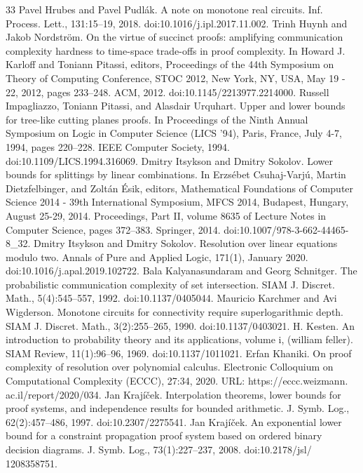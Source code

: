 \documentclass[10pt,a4paper]{article}
\begin{document}
\begin{thebibliography}{33}
 Pavel Hrubes and Pavel Pudlák. A note on monotone real circuits. Inf. Process. Lett., 131:15–19, 2018. doi:10.1016/j.ipl.2017.11.002.
 Trinh Huynh and Jakob Nordström. On the virtue of succinct proofs: amplifying communication complexity hardness to time-space trade-offs in proof complexity. In Howard J. Karloff and Toniann Pitassi, editors, Proceedings of the 44th Symposium on Theory of Computing Conference, STOC 2012, New York, NY, USA, May 19 - 22, 2012, pages 233–248. ACM, 2012. doi:10.1145/2213977.2214000.
 Russell Impagliazzo, Toniann Pitassi, and Alasdair Urquhart. Upper and lower bounds for tree-like cutting planes proofs. In Proceedings of the Ninth Annual Symposium on Logic in Computer Science (LICS ’94), Paris, France, July 4-7, 1994, pages 220–228. IEEE Computer Society, 1994. doi:10.1109/LICS.1994.316069.
 Dmitry Itsykson and Dmitry Sokolov. Lower bounds for splittings by linear combinations. In Erzsébet Csuhaj-Varjú, Martin Dietzfelbinger, and Zoltán Ésik, editors, Mathematical Foundations of Computer Science 2014 - 39th International Symposium, MFCS 2014, Budapest, Hungary, August 25-29, 2014. Proceedings, Part II, volume 8635 of Lecture Notes in Computer Science, pages 372–383. Springer, 2014. doi:10.1007/978-3-662-44465-8\_32.
 Dmitry Itsykson and Dmitry Sokolov. Resolution over linear equations modulo two. Annals of Pure and Applied Logic, 171(1), January 2020. doi:10.1016/j.apal.2019.102722.
 Bala Kalyanasundaram and Georg Schnitger. The probabilistic communication complexity of set intersection. SIAM J. Discret. Math., 5(4):545–557, 1992. doi:10.1137/0405044.
 Mauricio Karchmer and Avi Wigderson. Monotone circuits for connectivity require superlogarithmic depth. SIAM J. Discret. Math., 3(2):255–265, 1990. doi:10.1137/0403021.
 H. Kesten. An introduction to probability theory and its applications, volume i, (william feller). SIAM Review, 11(1):96–96, 1969. doi:10.1137/1011021.
 Erfan Khaniki. On proof complexity of resolution over polynomial calculus. Electronic Colloquium on Computational Complexity (ECCC), 27:34, 2020. URL: https://eccc.weizmann. ac.il/report/2020/034.
 Jan Krajíček. Interpolation theorems, lower bounds for proof systems, and independence results for bounded arithmetic. J. Symb. Log., 62(2):457–486, 1997. doi:10.2307/2275541.
 Jan Krajíček. An exponential lower bound for a constraint propagation proof system based on ordered binary decision diagrams. J. Symb. Log., 73(1):227–237, 2008. doi:10.2178/jsl/ 1208358751.

\end{thebibliography}
\end{document}
